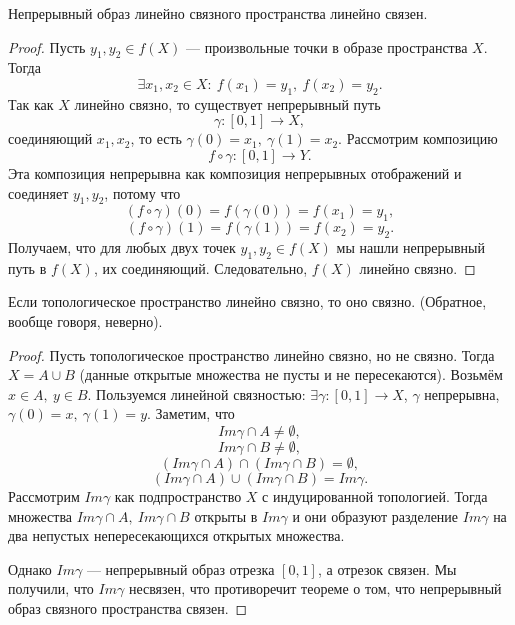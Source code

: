 \begin{statement}
    Непрерывный образ линейно связного пространства линейно связен.
\end{statement}
\begin{proof}
    Пусть $y_1, y_2 \in f(X)$ — произвольные точки в образе пространства $X$. Тогда $$\exists x_1, x_2 \in X: \ f(x_1) = y_1, \ f(x_2) = y_2.$$
    Так как $X$ линейно связно, то существует непрерывный путь 
    \[\gamma: [0,1] \to X,\]
    соединяющий $x_1, x_2$, то есть $\gamma(0) = x_1, \ \gamma(1) = x_2$.
Рассмотрим композицию
\[f \circ \gamma: [0,1] \to Y.\]
Эта композиция непрерывна как композиция непрерывных отображений и соединяет $y_1, y_2$, потому что 
\[(f \circ \gamma)(0) = f(\gamma(0)) = f(x_1) = y_1,\]
\[(f \circ \gamma)(1) = f(\gamma(1)) = f(x_2) = y_2.\]
Получаем, что для любых двух точек $y_1, y_2 \in f(X)$ мы нашли непрерывный путь в $f(X)$, их соединяющий. Следовательно, $f(X)$ линейно связно.
\end{proof}

\begin{statement}
    Если топологическое пространство линейно связно, то оно связно. (Обратное, вообще говоря, неверно).
\end{statement}
\begin{proof}
    Пусть топологическое пространство линейно связно, но не связно. Тогда $X = A \cup B$ (данные открытые множества не пусты и не пересекаются). Возьмём $x \in A, \ y \in B$. Пользуемся линейной связностью: $\exists \gamma: [0, 1] \to X$, $\gamma$ непрерывна, $\gamma(0) = x, \ \gamma(1) = y$.
    Заметим, что $$Im \gamma \cap A \neq \emptyset,$$ 
    $$Im \gamma \cap B \neq \emptyset,$$
    $$(Im \gamma \cap A) \cap (Im \gamma \cap B) = \emptyset,$$
    $$(Im \gamma \cap A) \cup (Im \gamma \cap B) = Im \gamma.$$
    Рассмотрим $Im \gamma$ как подпространство $X$ с индуцированной топологией. Тогда множества $Im \gamma \cap A, \ Im \gamma \cap B$ открыты в $Im \gamma$ и они образуют разделение $Im \gamma$ на два непустых непересекающихся открытых множества.

    Однако $Im \gamma$ — непрерывный образ отрезка $[0,1]$, а отрезок связен. Мы получили, что $Im \gamma$ несвязен, что противоречит теореме о том, что непрерывный образ связного пространства связен.
\end{proof}

